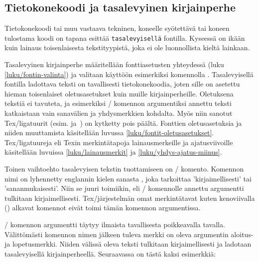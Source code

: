 
\subsection{Tietokonekoodi ja tasalevyinen kirjainperhe}

Tietokonekoodi tai muu vastaava tekninen, koneelle syötettävä tai koneen
tulostama koodi on tapana esittää \texttt{tasalevyisellä} fontilla.
Kyseessä on ikään kuin lainaus toisenlaisesta tekstityypistä, joka ei
ole luonnollista kieltä lainkaan.

Tasalevyinen kirjainperhe määritellään fonttiasetusten yhteydessä (luku
\ref{luku/fontin-valinta}) ja valitaan käyttöön esimerkiksi komennolla
. Tasalevyisellä fontilla ladottava teksti on
tavallisesti tietokonekoodia, joten sille on asetettu hieman
toisenlaiset oletusasetukset kuin muille kirjainperheille. Oletuksena
tekstiä ei tavuteta, ja esimerkiksi \-/ komennon
argumentiksi annettu teksti katkaistaan vain sanavälien ja yhdysmerkkien
kohdalta. Myös niin sanotut Tex\-/ligatuurit (esim. 
ja~\koodi{--}) on kytketty pois päältä. Fonttien oletusasetuksia ja
niiden muuttamista käsitellään luvussa
\ref{luku/fontit-oletusasetukset}. Tex\-/ligatuureja eli Texin
merkintätapoja lainausmerkeille ja ajatusviivoille käsitellään luvuissa
\ref{luku/lainausmerkit} ja \ref{luku/yhdys-ajatus-miinus}.

Toinen vaihtoehto tasalevyisen tekstin tuottamiseen on
\-/ komento. Komennon nimi on lyhennetty englannin kielen
sanasta , joka tarkoittaa 'kirjaimellisesti' tai
'sananmukaisesti'. Niin se juuri toimiikin, eli \-/
komennolle annettu argumentti tulkitaan kirjaimellisesti.
Tex\-/järjestelmän omat merkintätavat kuten kenoviivalla (\koodi{\keno})
alkavat komennot eivät toimi tämän komennon argumentissa.

\-/ komennon argumentti täytyy ilmaista tavallisesta
poikkeavalla tavalla. Välittömästi komennon nimen jälkeen tuleva merkki
on oleva argumentin aloitus- ja lopetusmerkki. Niiden välissä oleva
teksti tulkitaan kirjaimellisesti ja ladotaan tasalevyisellä
kirjainperheellä. Seuraavassa on tästä kaksi esimerkkiä:

